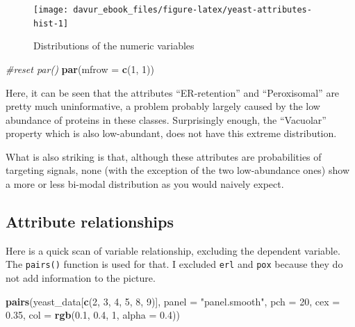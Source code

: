 \documentclass[]{book}
\newenvironment{Shaded}{\begin{snugshade}}{\end{snugshade}}
\newcommand{\CommentTok}[1]{\textcolor[rgb]{0.56,0.35,0.01}{\textit{#1}}}
\newcommand{\DataTypeTok}[1]{\textcolor[rgb]{0.13,0.29,0.53}{#1}}
\newcommand{\DecValTok}[1]{\textcolor[rgb]{0.00,0.00,0.81}{#1}}
\newcommand{\FloatTok}[1]{\textcolor[rgb]{0.00,0.00,0.81}{#1}}
\newcommand{\KeywordTok}[1]{\textcolor[rgb]{0.13,0.29,0.53}{\textbf{#1}}}
\newcommand{\NormalTok}[1]{#1}
\newcommand{\StringTok}[1]{\textcolor[rgb]{0.31,0.60,0.02}{#1}}
\begin{document}
\begin{figure}
\texttt{[image: davur\_ebook\_files/figure-latex/yeast-attributes-hist-1]} \caption{Distributions of the numeric variables}\label{fig:yeast-attributes-hist}
\end{figure}

\begin{Shaded}
\begin{Highlighting}[]
\CommentTok{#reset par()}
\KeywordTok{par}\NormalTok{(}\DataTypeTok{mfrow =} \KeywordTok{c}\NormalTok{(}\DecValTok{1}\NormalTok{, }\DecValTok{1}\NormalTok{))}
\end{Highlighting}
\end{Shaded}

Here, it can be seen that the attributes ``ER-retention'' and ``Peroxisomal'' are pretty much uninformative, a problem probably largely caused by the low abundance of proteins in these classes. Surprisingly enough, the ``Vacuolar'' property which is also low-abundant, does not have this extreme distribution.

What is also striking is that, although these attributes are probabilities of targeting signals, none (with the exception of the two low-abundance ones) show a more or less bi-modal distribution as you would naively expect.

\hypertarget{attribute-relationships}{%
\subsection{Attribute relationships}\label{attribute-relationships}}

Here is a quick scan of variable relationship, excluding the dependent variable. The \texttt{pairs()} function is used for that. I excluded \texttt{erl} and \texttt{pox} because they do not add information to the picture.

\begin{Shaded}
\begin{Highlighting}[]
\KeywordTok{pairs}\NormalTok{(yeast_data[}\KeywordTok{c}\NormalTok{(}\DecValTok{2}\NormalTok{, }\DecValTok{3}\NormalTok{, }\DecValTok{4}\NormalTok{, }\DecValTok{5}\NormalTok{, }\DecValTok{8}\NormalTok{, }\DecValTok{9}\NormalTok{)],}
      \DataTypeTok{panel =} \StringTok{"panel.smooth"}\NormalTok{,}
      \DataTypeTok{pch =} \DecValTok{20}\NormalTok{, }
      \DataTypeTok{cex =} \FloatTok{0.35}\NormalTok{,}
      \DataTypeTok{col =} \KeywordTok{rgb}\NormalTok{(}\FloatTok{0.1}\NormalTok{, }\FloatTok{0.4}\NormalTok{, }\DecValTok{1}\NormalTok{, }\DataTypeTok{alpha =} \FloatTok{0.4}\NormalTok{))}
\end{Highlighting}
\end{Shaded}
\end{document}
